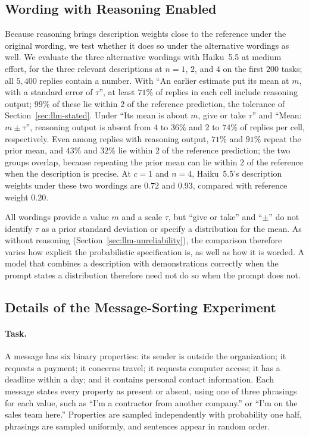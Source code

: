 \subsection{Wording with Reasoning Enabled}\label{sec:llm-wording-reasoning}

Because reasoning brings description weights close to the reference under the original wording, we test whether it does so under the alternative wordings as well. We evaluate the three alternative wordings with Haiku~5.5 at medium effort, for the three relevant descriptions at $n = 1$, $2$, and $4$ on the first $200$ tasks; all $5{,}400$ replies contain a number. With ``An earlier estimate put its mean at $m$, with a standard error of $\tau$'', at least $71\%$ of replies in each cell include reasoning output; $99\%$ of these lie within $2$ of the reference prediction, the tolerance of Section~\ref{sec:llm-stated}. Under ``Its mean is about $m$, give or take $\tau$'' and ``Mean: $m \pm \tau$'', reasoning output is absent from $4$ to $36\%$ and $2$ to $74\%$ of replies per cell, respectively. Even among replies with reasoning output, $71\%$ and $91\%$ repeat the prior mean, and $43\%$ and $32\%$ lie within $2$ of the reference prediction; the two groups overlap, because repeating the prior mean can lie within $2$ of the reference when the description is precise. At $c = 1$ and $n = 4$, Haiku~5.5's description weights under these two wordings are $0.72$ and $0.93$, compared with reference weight $0.20$.

All wordings provide a value $m$ and a scale $\tau$, but ``give or take'' and ``$\pm$'' do not identify $\tau$ as a prior standard deviation or specify a distribution for the mean. As without reasoning (Section~\ref{sec:llm-unreliability}), the comparison therefore varies how explicit the probabilistic specification is, as well as how it is worded. A model that combines a description with demonstrations correctly when the prompt states a distribution therefore need not do so when the prompt does not.

\subsection{Details of the Message-Sorting Experiment}\label{app:semantic}\label{app:filing}

\paragraph{Task.}
A message has six binary properties: its sender is outside the organization; it requests a payment; it concerns travel; it requests computer access; it has a deadline within a day; and it contains personal contact information. Each message states every property as present or absent, using one of three phrasings for each value, such as ``I'm a contractor from another company.'' or ``I'm on the sales team here.'' Properties are sampled independently with probability one half, phrasings are sampled uniformly, and sentences appear in random order.

